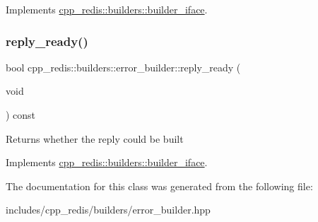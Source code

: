 Implements \hyperlink{classcpp__redis_1_1builders_1_1builder__iface_a9892bbc9c887c31c2742dad4476e2fa6}{cpp\+\_\+redis\+::builders\+::builder\+\_\+iface}.

\mbox{\label{classcpp__redis_1_1builders_1_1error__builder_af3d67647f012d0a7378684e2f8258a6d}} 
\subsubsection{\texorpdfstring{reply\+\_\+ready()}{reply\_ready()}}
{\footnotesize\ttfamily bool cpp\+\_\+redis\+::builders\+::error\+\_\+builder\+::reply\+\_\+ready (\begin{DoxyParamCaption}\item[{void}]{ }\end{DoxyParamCaption}) const\hspace{0.3cm}{\ttfamily [virtual]}}

\begin{DoxyReturn}{Returns}
whether the reply could be built 
\end{DoxyReturn}


Implements \hyperlink{classcpp__redis_1_1builders_1_1builder__iface_a40db9a31d4ea1771777e74146d31e12d}{cpp\+\_\+redis\+::builders\+::builder\+\_\+iface}.



The documentation for this class was generated from the following file\+:\begin{DoxyCompactItemize}
\item 
includes/cpp\+\_\+redis/builders/error\+\_\+builder.\+hpp\end{DoxyCompactItemize}
